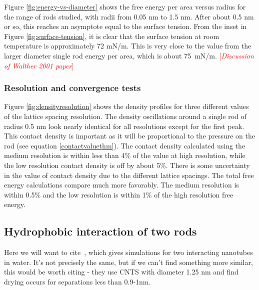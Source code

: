 \documentclass[letterpaper,twocolumn,amsmath,amssymb,prb]{revtex4-1}
\newcommand{\needsworknow}[1]{\textcolor{red}{[\emph{#1}]}}
\begin{document}
Figure \ref{fig:energy-vs-diameter} shows the free energy per area versus
radius for the range of rods studied, with radii from 0.05 nm to 1.5 nm. After 
about 0.5 nm or so, this reaches
an asymptote equal to the surface tension. From the inset in Figure 
\ref{fig:surface-tension}, it is clear that the surface tension at room 
temperature is approximately 72 mN/m. This is very close to the value from
the larger diameter single rod energy per area, which is about 75~mN/m. 
\needsworknow{Discussion of Walther 2001 paper\cite{walther2001carbon}}


\subsubsection{Resolution and convergence tests}
Figure \ref{fig:densityresolution} shows the density profiles for three
different values of the lattice spacing resolution. The density oscillations
around a single rod of radius 0.5 nm look nearly identical for all resolutions
except for the first peak. This contact density is important as it will be
proportional to the pressure on the rod (see equation \ref{contactvaluethm}). The contact
density calculated using the medium resolution is within less than 4\% of the
value at high resolution, while the low resolution contact density is off by
about 5\%. There is some uncertainty in the value of contact density due to the
different lattice spacings. The total free energy calculations compare much more
favorably. The medium resolution is within 0.5\% and the low resolution is
within 1\% of the high resolution free energy.

\subsection{Hydrophobic interaction of two rods}

Here we will want to cite~\cite{walther2004hydrodynamic}, which gives simulations for 
two interacting
nanotubes in water.  It's not precisely the same, but if we can't find something
more similar, this would be worth citing - they use CNTS with diameter 1.25 nm
and find drying occurs for separations less than 0.9-1nm.

\end{document}
